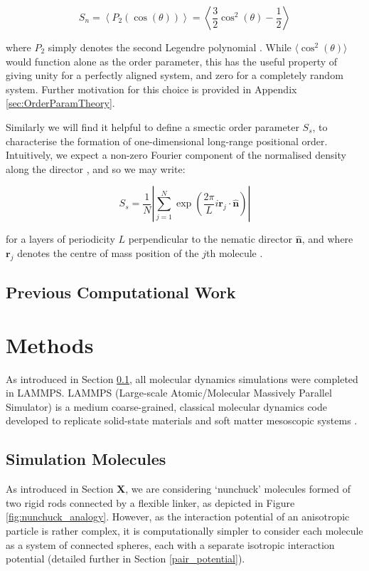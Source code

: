 \documentclass[11pt, a4paper]{article} %
\begin{document}
\begin{equation}
S_{n} = \left\langle P_{2}(\cos(\theta)) \right\rangle = \left\langle \frac{3}{2}\cos^{2}(\theta) - \frac{1}{2} \right\rangle 
\end{equation}

where $P_{2}$ simply denotes the second Legendre polynomial \cite{deGennes1993}. While $\langle \cos^{2}(\theta) \rangle$ would function alone as the order parameter, this has the useful property of giving unity for a perfectly aligned system, and zero for a completely random system. Further motivation for this choice is provided in Appendix \ref{sec:OrderParamTheory}.


Similarly we will find it helpful to define a smectic order parameter $S_{s}$, to characterise the formation of one-dimensional long-range positional order. Intuitively, we expect a non-zero Fourier component of the normalised density along the director \cite{Polson1997}, and so we may write:

\begin{equation}
S_{s} = \frac{1}{N} \left\lvert \sum_{j=1}^{N} \exp \left( {\frac{2\pi}{L}i\textbf{r}_{j} \cdot \boldsymbol{\hat{n}}} \right) \right\rvert
\end{equation}

for a layers of periodicity $L$ perpendicular to the nematic director $\boldsymbol{\hat{n}}$, and where $\textbf{r}_{j}$ denotes the centre of mass position of the $j$th molecule \cite{Dussi2018}.

\subsection{Previous Computational Work} \label{sec:PrevWork}

\section{Methods}
As introduced in Section \ref{sec:PrevWork}, all molecular dynamics simulations were completed in LAMMPS. LAMMPS (Large-scale Atomic/Molecular Massively Parallel Simulator) is a medium coarse-grained, classical molecular dynamics code developed to replicate  solid-state materials and soft matter mesoscopic systems \cite{Plimpton1995, LAMMPS}.



\subsection{Simulation Molecules} \label{sec:SimMolecules}
As introduced in Section \textbf{X}, we are considering `nunchuck' molecules formed of two rigid rods connected by a flexible linker, as depicted in Figure \ref{fig:nunchuck_analogy}. However, as the interaction potential of an anisotropic particle is rather complex, it is computationally simpler to consider each molecule as a system of connected spheres, each with a separate isotropic interaction potential (detailed further in Section \ref{pair_potential}).
\end{document}
